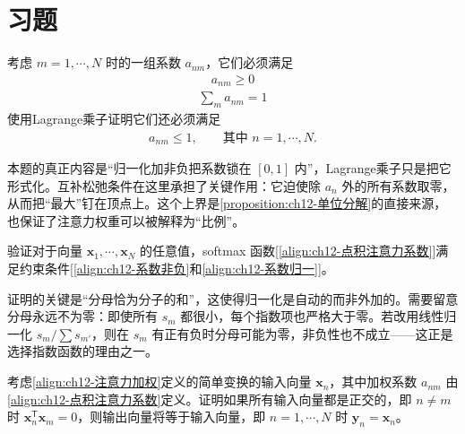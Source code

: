 \documentclass[../../main.tex]{subfiles}
\begin{document}
\section{习题}\label{section:ch12-习题}

\begin{exercise}\label{exercise:ch12-01}
考虑 $m=1,\cdots,N$ 时的一组系数 $a_{nm}$，它们必须满足
\begin{align}
a_{nm}\geqslant0
\label{align:ch12-习题系数非负}
\end{align}
\begin{align}
\sum_{m}a_{nm}=1
\label{align:ch12-习题系数归一}
\end{align}
使用Lagrange乘子证明它们还必须满足
\begin{align}
a_{nm}\leqslant1,\qquad \text{其中 }n=1,\cdots,N.
\label{align:ch12-习题系数上界}
\end{align}
\end{exercise}

\begin{remark}
本题的真正内容是“归一化加非负把系数锁在 $[0,1]$ 内”，Lagrange乘子只是把它形式化。互补松弛条件在这里承担了关键作用：它迫使除 $a_n$ 外的所有系数取零，从而把“最大”钉在顶点上。这个上界是\cref{proposition:ch12-单位分解}的直接来源，也保证了注意力权重可以被解释为“比例”。
\end{remark}

\begin{exercise}[（$\star$）]\label{exercise:ch12-02}
验证对于向量 $\mathbf{x}_1,\cdots,\mathbf{x}_N$ 的任意值，softmax 函数[\eqref{align:ch12-点积注意力系数}]满足约束条件[\eqref{align:ch12-系数非负}和\eqref{align:ch12-系数归一}]。
\end{exercise}

\begin{remark}
证明的关键是“分母恰为分子的和”，这使得归一化是自动的而非外加的。需要留意分母永远不为零：即使所有 $s_m$ 都很小，每个指数项也严格大于零。若改用线性归一化 $s_m/\sum s_{m'}$，则在 $s_m$ 有正有负时分母可能为零，非负性也不成立——这正是选择指数函数的理由之一。
\end{remark}

\begin{exercise}[（$\star$）]\label{exercise:ch12-03}
考虑\eqref{align:ch12-注意力加权}定义的简单变换的输入向量 $\mathbf{x}_n$，其中加权系数 $a_{nm}$ 由\eqref{align:ch12-点积注意力系数}定义。证明如果所有输入向量都是正交的，即 $n\neq m$ 时 $\mathbf{x}_n^{\mathsf{T}}\mathbf{x}_m=0$，则输出向量将等于输入向量，即 $n=1,\cdots,N$ 时 $\mathbf{y}_n=\mathbf{x}_n$。
\end{exercise}
\end{document}
